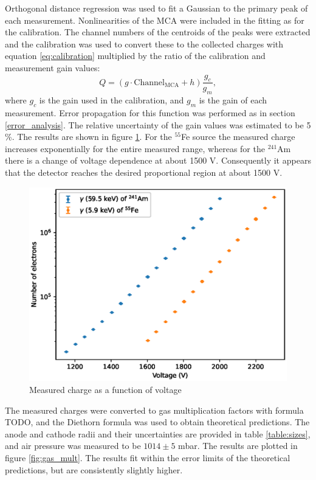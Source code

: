 \documentclass[a4paper]{article}
\begin{document}
\FloatBarrier

Orthogonal distance regression was used to fit a Gaussian to the primary peak of each measurement.
Nonlinearities of the MCA were included in the fitting as for the calibration.
The channel numbers of the centroids of the peaks were extracted and the calibration was used to convert these to the collected charges with equation \ref{eq:calibration} multiplied by the ratio of the calibration and measurement gain values:
\begin{equation}
Q = (g \cdot \text{Channel}_\text{MCA} + h) \frac{g_c}{g_m},
\end{equation}
where $g_c$ is the gain used in the calibration, and $g_m$ is the gain of each measurement.
Error propagation for this function was performed as in section \ref{error_analysis}.
The relative uncertainty of the gain values was estimated to be 5 \%.
The results are shown in figure \ref{fig:hv_scans}.
For the $^{55}$Fe source the measured charge increases exponentially for the entire measured range, whereas for the $^{241}$Am there is a change of voltage dependence at about 1500 V.
Consequently it appears that the detector reaches the desired proportional region at about 1500 V.

\begin{figure}[ht!]
\centering
\includegraphics[width=\textwidth]{fig/python/hv_scans.eps}
\caption{Measured charge as a function of voltage}
\label{fig:hv_scans}
\end{figure}

\FloatBarrier
The measured charges were converted to gas multiplication factors with formula TODO, and the Diethorn formula was used to obtain theoretical predictions.
The anode and cathode radii and their uncertainties are provided in table \ref{table:sizes}, and air pressure was measured to be $1014 \pm 5$ mbar.
The results are plotted in figure \ref{fig:gas_mult}.
The results fit within the error limits of the theoretical predictions, but are consistently slightly higher.
\end{document}
